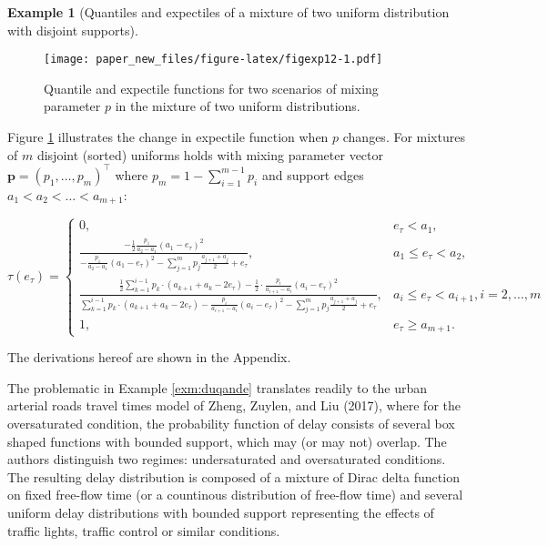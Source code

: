 \documentclass[
]{article}
\theoremstyle{definition}
\theoremstyle{definition}
\newtheorem{example}{Example}[section]
\theoremstyle{definition}
\theoremstyle{definition}
\theoremstyle{remark}
\begin{document}
\begin{example}[Quantiles and expectiles of a mixture of two uniform distribution with disjoint supports]
\begin{figure}
\centering
\texttt{[image: paper\_new\_files/figure-latex/figexp12-1.pdf]}
\caption{\label{fig:figexp12}Quantile and expectile functions for two scenarios of mixing parameter \(p\) in the mixture of two uniform distributions.}
\end{figure}

Figure \ref{fig:figexp12} illustrates the change in expectile function when \(p\) changes.
For mixtures of \(m\) disjoint (sorted) uniforms holds with mixing parameter vector \(\mathbf p=(p_1,\ldots,p_m)^\top\) where \(p_m=1-\sum_{i=1}^{m-1}p_i\) and support edges \(a_1<a_2<\ldots<a_{m+1}\):

\[\tau(e_\tau) = 
\begin{cases}
0,&e_\tau<a_1,\\
\frac{-\frac 12\frac{p_1}{a_2-a_1}(a_1-e_\tau)^2}  {-\frac{p_1}{a_2-a_1}(a_1-e_\tau)^2- \sum_{j=1}^mp_j\frac{a_{j+1}+a_j}2 +e_\tau} ,&a_1\leq e_\tau< a_2,\\
\frac{\frac 12\sum_{k=1}^{i-1}p_k\cdot (a_{k+1}+a_{k}-2e_\tau) -\frac 12 \cdot \frac{p_i}{a_{i+1}-a_i}(a_i-e_\tau)^2}  {\sum_{k=1}^{i-1}p_k\cdot (a_{k+1}+a_{k}-2e_\tau) -\frac{p_i}{a_{i+1}-a_i}(a_i-e_\tau)^2- \sum_{j=1}^mp_j\frac{a_{j+1}+a_j}2 +e_\tau} ,&a_i\leq e_\tau< a_{i+1},i=2,\ldots, m\\
1, &e_\tau\geq a_{m+1}.
\end{cases}\]

The derivations hereof are shown in the Appendix.
\end{example}

The problematic in Example \ref{exm:duqande} translates readily to the urban arterial roads travel times model of Zheng, Zuylen, and Liu (2017), where for the oversaturated condition, the probability function of delay consists of several box shaped functions with bounded support, which may (or may not) overlap. The authors distinguish two regimes: undersaturated and oversaturated conditions. The resulting delay distribution is composed of a mixture of Dirac delta function on fixed free-flow time (or a countinous distribution of free-flow time) and several uniform delay distributions with bounded support representing the effects of traffic lights, traffic control or similar conditions.
\end{document}
